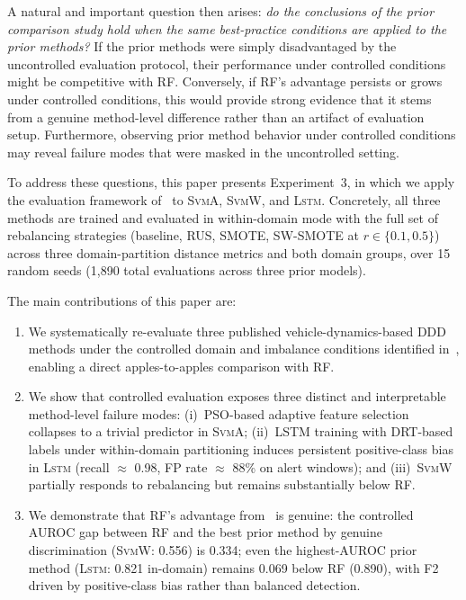 \documentclass[lettersize,journal]{IEEEtran}
\newcommand{\Impl}[1]{\textsc{#1}}
\begin{document}
A natural and important question then arises: \emph{do the conclusions of the prior comparison study hold when the same best-practice conditions are applied to the prior methods?}
If the prior methods were simply disadvantaged by the uncontrolled evaluation protocol, their performance under controlled conditions might be competitive with RF.
Conversely, if RF's advantage persists or grows under controlled conditions, this would provide strong evidence that it stems from a genuine method-level difference rather than an artifact of evaluation setup.
Furthermore, observing prior method behavior under controlled conditions may reveal failure modes that were masked in the uncontrolled setting.

To address these questions, this paper presents Experiment~3, in which we apply the evaluation framework of~\cite{nakagama2026tiv} to \Impl{SvmA}, \Impl{SvmW}, and \Impl{Lstm}.
Concretely, all three methods are trained and evaluated in within-domain mode with the full set of rebalancing strategies (baseline, RUS, SMOTE, SW-SMOTE at $r \in \{0.1, 0.5\}$) across three domain-partition distance metrics and both domain groups, over 15 random seeds (1{,}890 total evaluations across three prior models).

The main contributions of this paper are:
\begin{enumerate}
\item We systematically re-evaluate three published vehicle-dynamics-based DDD methods under the controlled domain and imbalance conditions identified in~\cite{nakagama2026tiv}, enabling a direct apples-to-apples comparison with RF.

\item We show that controlled evaluation exposes three distinct and interpretable method-level failure modes: (i)~PSO-based adaptive feature selection collapses to a trivial predictor in \Impl{SvmA}; (ii)~LSTM training with DRT-based labels under within-domain partitioning induces persistent positive-class bias in \Impl{Lstm} (recall $\approx$ 0.98, FP rate $\approx$ 88\% on alert windows); and (iii)~\Impl{SvmW} partially responds to rebalancing but remains substantially below RF.

\item We demonstrate that RF's advantage from~\cite{nakagama2025iv} is genuine: the controlled AUROC gap between RF and the best prior method by genuine discrimination (\Impl{SvmW}: 0.556) is 0.334; even the highest-AUROC prior method (\Impl{Lstm}: 0.821 in-domain) remains 0.069 below RF (0.890), with F2 driven by positive-class bias rather than balanced detection.
\end{enumerate}
\end{document}
